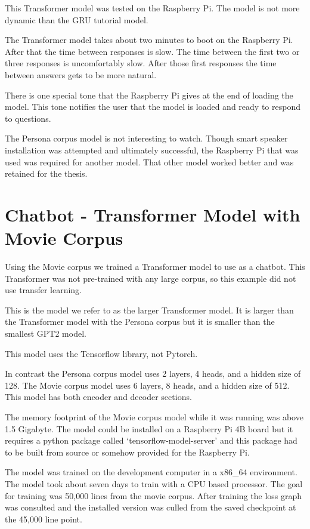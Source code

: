 This Transformer model was tested on the Raspberry Pi. The model is not more dynamic than the GRU tutorial model. 

The Transformer model takes about two minutes to boot on the Raspberry Pi. After that the time between responses is slow. The time between the first two or three responses is uncomfortably slow. After those first responses the time between answers gets to be more natural.

There is one special tone that the Raspberry Pi gives at the end of loading the model. This tone notifies the user that the model is loaded and ready to respond to questions.

The Persona corpus model is not interesting to watch. Though smart speaker installation was attempted and ultimately successful, the Raspberry Pi that was used was required for another model. That other model worked better and was retained for the thesis.

\section{Chatbot - Transformer Model with Movie Corpus}


Using the Movie corpus we trained a Transformer model to use as a chatbot. This Transformer was not pre-trained with any large corpus, so this example did not use transfer learning. 

This is the model we refer to as the larger Transformer model. It is larger than the Transformer model with the Persona corpus but it is smaller than the smallest GPT2 model.

This model uses the Tensorflow library, not Pytorch. %

In contrast the Persona corpus model uses 2 layers, 4 heads, and a hidden size of 128. The Movie corpus model uses 6 layers, 8 heads, and a hidden size of 512. This model has both encoder and decoder sections.

The memory footprint of the Movie corpus model while it was running was above 1.5 Gigabyte. The model could be installed on a Raspberry Pi 4B board but it requires a python package called `tensorflow-model-server' and this package had to be built from source or somehow provided for the Raspberry Pi. 

The model was trained on the development computer in a x86\_64 environment. The model took about seven days to train with a CPU based processor. The goal for training was 50,000 lines from the movie corpus. After training the loss graph was consulted and the installed version was culled from the saved checkpoint at the 45,000 line point.


